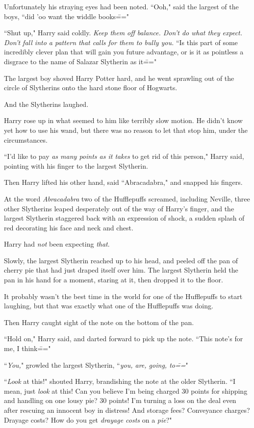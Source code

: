 Unfortunately his straying eyes had been noted. ``Ooh," said the largest of the boys, ``did 'oo want the widdle books\==="

``Shut up," Harry said coldly. \emph{Keep them off balance. Don't do what they expect. Don't fall into a pattern that calls for them to bully you.} ``Is this part of some incredibly clever plan that will gain you future advantage, or is it as pointless a disgrace to the name of Salazar Slytherin as it\==="

The largest boy shoved Harry Potter hard, and he went sprawling out of the circle of Slytherins onto the hard stone floor of Hogwarts.

And the Slytherins laughed.

Harry rose up in what seemed to him like terribly slow motion. He didn't know yet how to use his wand, but there was no reason to let that stop him, under the circumstances.

``I'd like to pay \emph{as many points as it takes} to get rid of this person," Harry said, pointing with his finger to the largest Slytherin.

Then Harry lifted his other hand, said ``Abracadabra," and snapped his fingers.

At the word \emph{Abracadabra} two of the Hufflepuffs screamed, including Neville, three other Slytherins leaped desperately out of the way of Harry's finger, and the largest Slytherin staggered back with an expression of shock, a sudden splash of red decorating his face and neck and chest.

Harry had \emph{not} been expecting \emph{that}.

Slowly, the largest Slytherin reached up to his head, and peeled off the pan of cherry pie that had just draped itself over him. The largest Slytherin held the pan in his hand for a moment, staring at it, then dropped it to the floor.

It probably wasn't the best time in the world for one of the Hufflepuffs to start laughing, but that was exactly what one of the Hufflepuffs was doing.

Then Harry caught sight of the note on the bottom of the pan.

``Hold on," Harry said, and darted forward to pick up the note. ``This note's for me, I think\==="

``\emph{You,}" growled the largest Slytherin, ``\emph{you, are, going, to\===}"

``\emph{Look} at this!" shouted Harry, brandishing the note at the older Slytherin. ``I mean, just \emph{look} at this! Can you believe I'm being charged 30 points for shipping and handling on one lousy pie? 30 points! I'm turning a loss on the deal even after rescuing an innocent boy in distress! And storage fees? Conveyance charges? Drayage costs? How do you get \emph{drayage costs} on a \emph{pie}?"

